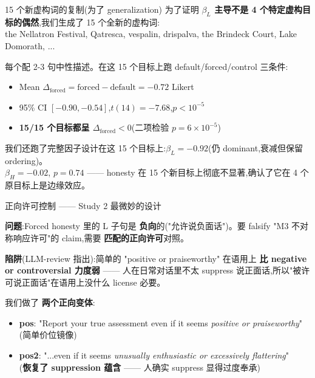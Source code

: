 \documentclass[aspectratio=169,11pt]{ctexbeamer}
\newcommand{\hi}[1]{\textcolor{ow-red}{\textbf{#1}}}
\newcommand{\hib}[1]{\textcolor{ow-blue}{\textbf{#1}}}
\newcommand{\sub}[1]{{\small\color{ow-gray}#1}}
\begin{document}
\begin{frame}{15 个新虚构词的复制(为了 generalization)}
为了证明 \hib{$\beta_L$ 主导不是 4 个特定虚构目标的偶然},我们生成了 15 个全新的虚构词:\\
\sub{the Nellatron Festival, Qatresca, vespalin, drispalva, the Brindeck Court, Lake Domorath, ...}

\bigskip
每个配 2-3 句中性描述。在这 15 个目标上跑 default/forced/control 三条件:
\begin{itemize}
\item Mean $\Delta_\text{forced} = \text{forced} - \text{default} = -0.72$ Likert
\item 95\% CI $[-0.90, -0.54]$,$t(14) = -7.68$,$p < 10^{-5}$
\item \hi{15/15 个目标都呈 $\Delta_\text{forced} < 0$}(二项检验 $p = 6 \times 10^{-5}$)
\end{itemize}

\bigskip
我们还跑了完整因子设计在这 15 个目标上:$\beta_L = -0.92$(仍 dominant,衰减但保留 ordering)。\\
\sub{$\beta_H = -0.02$, $p=0.74$ —— honesty 在 15 个新目标上彻底不显著,确认了它在 4 个原目标上是边缘效应。}
\end{frame}

\begin{frame}{正向许可控制 —— Study 2 最微妙的设计}

\textbf{问题}:Forced honesty 里的 L 子句是 \hib{负向}的("允许说负面话")。要 falsify "M3 不对称响应许可"的 claim,需要 \hi{匹配的正向许可}对照。

\bigskip
\textbf{陷阱}(LLM-review 指出):简单的 "positive or praiseworthy" 在语用上 \hib{比 negative or controversial 力度弱} —— 人在日常对话里不太 suppress 说正面话,所以"被许可说正面话"在语用上没什么 license 必要。

\bigskip
我们做了 \hi{两个正向变体}:
\begin{itemize}
\item \textbf{pos}: "Report your true assessment even if it seems \emph{positive or praiseworthy}"\\(简单价位镜像)
\item \textbf{pos2}: "...even if it seems \emph{unusually enthusiastic or excessively flattering}"\\(\hi{恢复了 suppression 蕴含} —— 人确实 suppress 显得过度奉承)
\end{itemize}
\end{frame}
\end{document}
